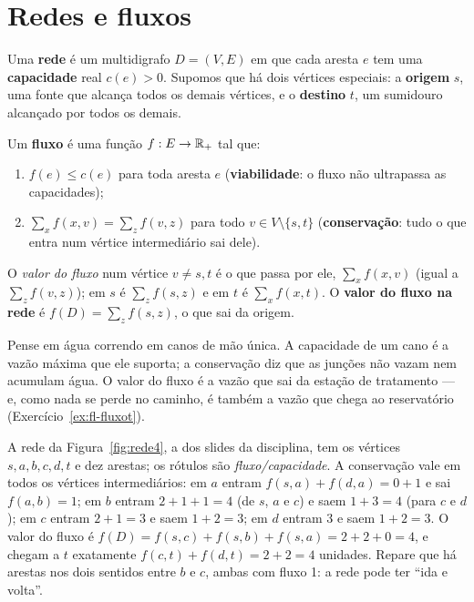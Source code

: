\section{Redes e fluxos}\label{sec:redes}
Uma \textbf{rede} é um multidigrafo $D=(V,E)$ em que cada aresta $e$ tem uma \textbf{capacidade} real $c(e)>0$. Supomos que há dois vértices especiais: a \textbf{origem} $s$, uma fonte que alcança todos os demais vértices, e o \textbf{destino} $t$, um sumidouro alcançado por todos os demais.

\begin{defi}[Fluxo]
Um \textbf{fluxo} é uma função $f:E\to\mathbb{R}_+$ tal que:
\begin{enumerate}
  \item $f(e)\le c(e)$ para toda aresta $e$ (\textbf{viabilidade}: o fluxo não ultrapassa as capacidades);
  \item $\sum_xf(x,v)=\sum_zf(v,z)$ para todo $v\in V\setminus\{s,t\}$ (\textbf{conservação}: tudo o que entra num vértice intermediário sai dele).
\end{enumerate}
\end{defi}
O \emph{valor do fluxo} num vértice $v\ne s,t$ é o que passa por ele, $\sum_xf(x,v)$ (igual a $\sum_zf(v,z)$); em $s$ é $\sum_zf(s,z)$ e em $t$ é $\sum_xf(x,t)$. O \textbf{valor do fluxo na rede} é $f(D)=\sum_zf(s,z)$, o que sai da origem.

\begin{intuicao}
Pense em água correndo em canos de mão única. A capacidade de um cano é a vazão máxima que ele suporta; a conservação diz que as junções não vazam nem acumulam água. O valor do fluxo é a vazão que sai da estação de tratamento --- e, como nada se perde no caminho, é também a vazão que chega ao reservatório (Exercício~\ref{ex:fl-fluxot}).
\end{intuicao}

\begin{exemplo}\label{ex:fluxo4}
A rede da Figura~\ref{fig:rede4}, a dos slides da disciplina, tem os vértices $s,a,b,c,d,t$ e dez arestas; os rótulos são \emph{fluxo/capacidade}. A conservação vale em todos os vértices intermediários: em $a$ entram $f(s,a)+f(d,a)=0+1$ e sai $f(a,b)=1$; em $b$ entram $2+1+1=4$ (de $s$, $a$ e $c$) e saem $1+3=4$ (para $c$ e $d$); em $c$ entram $2+1=3$ e saem $1+2=3$; em $d$ entram 3 e saem $1+2=3$. O valor do fluxo é $f(D)=f(s,c)+f(s,b)+f(s,a)=2+2+0=4$, e chegam a $t$ exatamente $f(c,t)+f(d,t)=2+2=4$ unidades. Repare que há arestas nos dois sentidos entre $b$ e $c$, ambas com fluxo 1: a rede pode ter ``ida e volta''.
\begin{figura}
\end{figura}
\end{exemplo}

